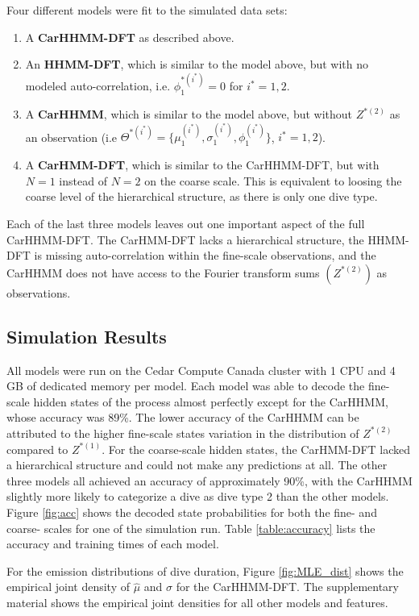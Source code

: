 Four different models were fit to the simulated data sets:
\begin{enumerate}
    \item A \textbf{CarHHMM-DFT} as described above.
    \item An \textbf{HHMM-DFT}, which is similar to the model above, but with no modeled auto-correlation, i.e. $\phi_1^{*(i^*)} = 0$ for $i^* = 1,2$.
    \item A \textbf{CarHHMM}, which is similar to the model above, but without $Z^{*(2)}$ as an observation (i.e $\Theta^{*(i^*)} = \{\mu_1^{(i^*)},\sigma_1^{(i^*)},\phi_1^{(i^*)}\}$, $i^* = 1,2$).
    \item A \textbf{CarHMM-DFT}, which is similar to the CarHHMM-DFT, but with $N=1$ instead of $N=2$ on the coarse scale. This is equivalent to loosing the coarse level of the hierarchical structure, as there is only one dive type.
\end{enumerate}
%
Each of the last three models leaves out one important aspect of the full CarHHMM-DFT. The CarHMM-DFT lacks a hierarchical structure, the HHMM-DFT is missing auto-correlation within the fine-scale observations, and the CarHHMM does not have access to the Fourier transform sums $(Z^{*(2)})$ as observations. 

\subsection{Simulation Results}

All models were run on the Cedar Compute Canada cluster with 1 CPU and 4 GB of dedicated memory per model.
Each model was able to decode the fine-scale hidden states of the process almost perfectly except for the CarHHMM, whose accuracy was 89\%. The lower accuracy of the CarHHMM can be attributed to the higher fine-scale states variation in the distribution of $Z^{*(2)}$ compared to $Z^{*(1)}$. For the coarse-scale hidden states, the CarHMM-DFT lacked a hierarchical structure and could not make any predictions at all. The other three models all achieved an accuracy of approximately 90\%, with the CarHHMM slightly more likely to categorize a dive as dive type 2 than the other models. Figure \ref{fig:acc} shows the decoded state probabilities for both the fine- and coarse- scales for one of the simulation run. Table \ref{table:accuracy} lists the accuracy and training times of each model.

For the emission distributions of dive duration, Figure \ref{fig:MLE_dist} shows the empirical joint density of $\hat \mu$ and $\hat \sigma$ for the CarHHMM-DFT. The supplementary material shows the empirical joint densities for all other models and features.

